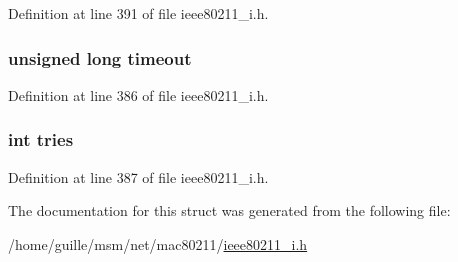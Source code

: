 Definition at line 391 of file ieee80211\-\_\-i.\-h.

\hypertarget{structieee80211__mgd__auth__data_a639e65bbd749de17060d658eb233f72b}{
\subsubsection[{timeout}]{\setlength{\rightskip}{0pt plus 5cm}unsigned long timeout}}\label{structieee80211__mgd__auth__data_a639e65bbd749de17060d658eb233f72b}


Definition at line 386 of file ieee80211\-\_\-i.\-h.

\hypertarget{structieee80211__mgd__auth__data_a04cecf6708b77deed43900afdf14e8d9}{
\subsubsection[{tries}]{\setlength{\rightskip}{0pt plus 5cm}int tries}}\label{structieee80211__mgd__auth__data_a04cecf6708b77deed43900afdf14e8d9}


Definition at line 387 of file ieee80211\-\_\-i.\-h.



The documentation for this struct was generated from the following file\-:\begin{DoxyCompactItemize}
\item 
/home/guille/msm/net/mac80211/\hyperlink{ieee80211__i_8h}{ieee80211\-\_\-i.\-h}\end{DoxyCompactItemize}

